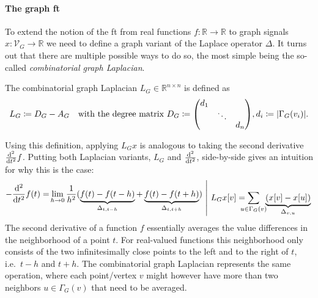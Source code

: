 \paragraph{The graph \acl{ft}}
To extend the notion of the \ac{ft} from real functions $f: \mathbb{R} \to \mathbb{R}$ to graph signals $x: \mathcal{V}_G \to \mathbb{R}$ we need to define a graph variant of the Laplace operator $\Delta$.
It turns out that there are multiple possible ways to do so, the most simple being the so-called \textit{combinatorial graph Laplacian}.
\begin{defn}
	The combinatorial graph Laplacian $L_G \in \mathbb{R}^{n \times n}$ is defined as
	\begin{align*}
		L_G \coloneqq D_G - A_G\quad\text{with the degree matrix } D_G\coloneqq {
			\renewcommand*{\arraystretch}{0.5}
			\begin{pmatrix}
				d_1 & & \\
				& \ddots & \\
				& & d_n
			\end{pmatrix}
		}, d_i \coloneqq |\Gamma_G(v_i)| \text{.}
	\end{align*}
\end{defn}
Using this definition, applying $L_G x$ is analogous to taking the second derivative $\frac{\mathop{}\!\mathrm{d}^2}{\mathop{}\!\mathrm{d} t^2} f$.
Putting both Laplacian variants, $L_G$ and $\frac{\mathop{}\!\mathrm{d}^2}{\mathop{}\!\mathrm{d} t^2}$, side-by-side gives an intuition for why this is the case:
\begin{equation*}
	\begin{split}
		-\frac{\dif^2}{\dif t^2} f(t) = \smashoperator[l]{\lim_{h \to 0}} \frac{1}{h^2} (\underbrace{f(t) - f(t-h)}_{\Delta_{t, t-h}} + \underbrace{f(t) -  f(t+h)}_{\Delta_{t, t+h}})
	\end{split}
	\begin{split}\ \left|\ %
		L_G x[v] = \smashoperator[l]{\sum_{u \in \Gamma_G(v)}}\mkern-6mu \underbrace{(x[v] - x[u])}_{\Delta_{v, u}}
	\right.\end{split}
\end{equation*}
The second derivative of a function $f$ essentially averages the value differences in the neighborhood of a point $t$.
For real-valued functions this neighborhood only consists of the two infinitesimally close points to the left and to the right of $t$, i.e.\ $t - h$ and $t + h$.
The combinatorial graph Laplacian represents the same operation, where each point/vertex $v$ might however have more than two neighbors $u \in \Gamma_G(v)$ that need to be averaged.


